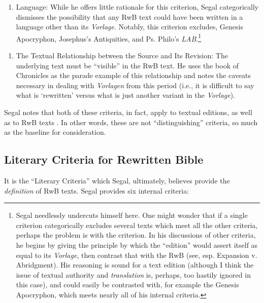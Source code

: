\begin{enumerate}
\def\labelenumi{\arabic{enumi}.}
\tightlist
\item
  Language: While he offers little rationale for this criterion, Segal
  categorically dismisses the possibility that any RwB text could have
  been written in a language other than its \emph{Vorlage}. Notably,
  this criterion excludes, Genesis Apocryphon, Josephus's Antiquities,
  and Ps. Philo's \emph{LAB}.\footnote{Segal needlessly undercuts
    himself here. One might wonder that if a single criterion
    categorically excludes several texts which meet all the other
    criteria, perhaps the problem is with the criterion. In his
    discussions of other criteria, he begins by giving the principle by
    which the ``edition'' would assert itself as equal to its
    \emph{Vorlage}, then contrast that with the RwB (see, esp. Expansion
    v. Abridgment). His reasoning is sound for a text edition (although
    I think the issue of textual authority and \emph{translation} is,
    perhaps, too hastily ignored in this case), and could easily be
    contrasted with, for example the Genesis Apocryphon, which meets
    nearly all of his internal criteria.}
\end{enumerate}

\begin{enumerate}
\def\labelenumi{\arabic{enumi}.}
\setcounter{enumi}{1}
\tightlist
\item
  The Textual Relationship between the Source and Its Revision: The
  underlying text must be ``visible'' in the RwB text. He uses the book
  of Chronicles as the parade example of this relationship and notes the
  caveats necessary in dealing with \emph{Vorlagen} from this period
  (i.e., it is difficult to say what is `rewritten' versus what is just
  another variant in the \emph{Vorlage}).
\end{enumerate}

Segal notes that both of these criteria, in fact, apply to textual
editions, as well as to RwB texts \autocite[20]{segal_henze2005}. In
other words, these are not ``distinguishing'' criteria, so much as the
baseline for consideration.

\subsection{Literary Criteria for Rewritten
Bible}\label{literary-criteria-for-rewritten-bible}

It is the ``Literary Criteria'' which Segal, ultimately, believes
provide the \emph{definition} of RwB
texts.\autocite[20]{segal_henze2005} Segal provides six internal
criteria:


